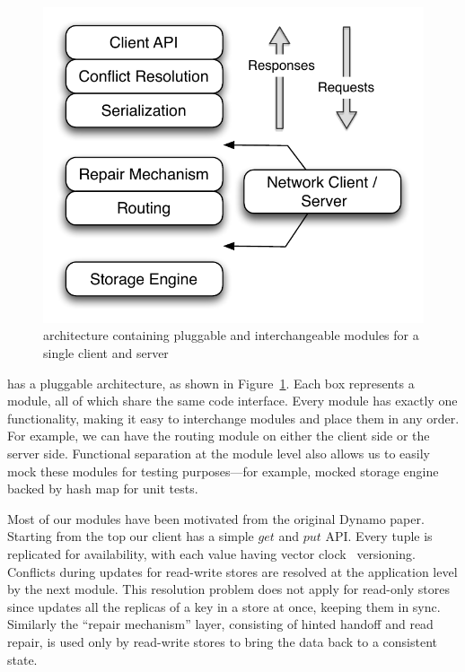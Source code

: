 \begin{figure}
  \centering
    \includegraphics[scale=0.55]{images/arch.pdf}
  \caption{\projectname{} architecture containing pluggable and interchangeable modules for a single client and server}
  \label{arch}
\end{figure}

\projectname{} has a pluggable architecture, as shown in
Figure~\ref{arch}. Each box represents a module, all of which share
the same code interface. Every module has exactly one functionality,
making it easy to interchange modules and place them in any order. For
example, we can have the routing module on either the client side or
the server side. Functional separation at the module level also allows
us to easily mock these modules for testing purposes---for example,
mocked storage engine backed by hash map for unit tests. 

Most of our modules have been motivated from the original Dynamo
paper. Starting from the top our client has a simple $get$ and $put$
API. Every tuple is replicated for availability, with each value having
vector clock~\cite{lamport} versioning. Conflicts during updates
for read-write stores are resolved at the application level by the
next module. This resolution problem does not apply for read-only
stores since \projectname{} updates all the replicas of a key in a
store at once, keeping them in sync. Similarly the ``repair
mechanism'' layer, consisting of hinted handoff and read repair, is
used only by read-write stores to bring the data back to a consistent
state. 

